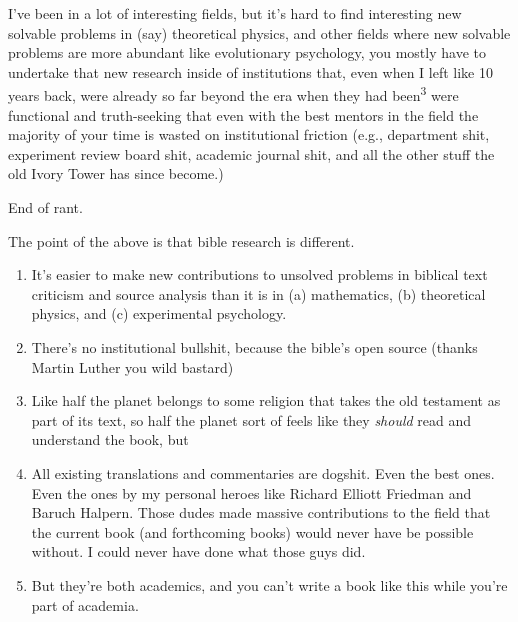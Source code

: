 \Sentence
{ \hX{} }
{ \eX{} }
{
    I've been in a lot of interesting fields, but it's hard to find interesting new solvable problems in (say) theoretical physics, and other fields where new solvable problems are more abundant like evolutionary psychology, you mostly have to undertake that new research inside of institutions that, even when I left like 10 years back, were already so far beyond the era when they had been\textsuperscript{3} were functional and truth-seeking that even with the best mentors in the field the majority of your time is wasted on institutional friction (e.g., department shit, experiment review board shit, academic journal shit, and all the other stuff the old Ivory Tower has since become.)
}

\Sentence
{ \hX{} }
{ \eX{} }
{
    End of rant.

    The point of the above is that bible research is different.

    \begin{enumerate}

    \item It's easier to make new contributions to unsolved problems in biblical text criticism and source analysis than it is in (a) mathematics, (b) theoretical physics, and (c) experimental psychology.

    \item There's no institutional bullshit, because the bible's open source (thanks Martin Luther you wild bastard)

    \item Like half the planet belongs to some religion that takes the old testament as part of its text, so half the planet sort of feels like they \emph{should} read and understand the book, but

    \item All existing translations and commentaries are dogshit. Even the best ones. Even the ones by my personal heroes like Richard Elliott Friedman and Baruch Halpern. Those dudes made massive contributions to the field that the current book (and forthcoming books) would never have be possible without. I could never have done what those guys did.

    \item But they're both academics, and you can't write a book like this while you're part of academia.

    \end{enumerate}
}

